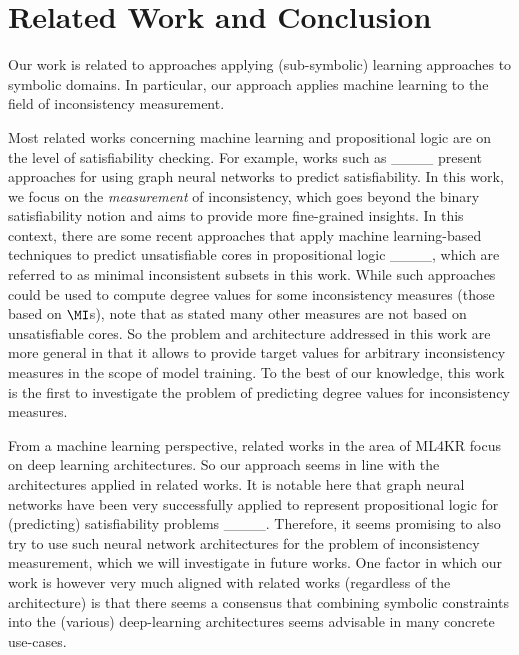 \section{Related Work and Conclusion}
\label{sec:conclusion}

Our work is related to approaches applying (sub-symbolic) learning approaches to symbolic domains. In particular, our approach applies machine learning to the field of inconsistency measurement.

Most related works concerning machine learning and propositional logic are on the level of satisfiability checking. For example, works such as ____ present approaches for using graph neural networks to predict satisfiability. In this work, we focus on the \emph{measurement} of inconsistency, which goes beyond the binary satisfiability notion and aims to provide more fine-grained insights. In this context, there are some recent approaches that apply machine learning-based techniques to predict unsatisfiable cores in propositional logic ____, which are referred to as minimal inconsistent subsets in this work. While such approaches could be used to compute degree values for some inconsistency measures (those based on $\MI$s), note that as stated many other measures are not based on unsatisfiable cores. So the problem and architecture addressed in this work are more general in that it allows to provide target values for arbitrary inconsistency measures in the scope of model training. To the best of our knowledge, this work is the first to investigate the problem of predicting degree values for inconsistency measures.

From a machine learning perspective, related works in the area of ML4KR focus on deep learning architectures. So our approach seems in line with the architectures applied in related works. It is notable here that graph neural networks have been very successfully applied to represent propositional logic for (predicting) satisfiability problems ____. Therefore, it seems promising to also try to use such neural network architectures for the problem of inconsistency measurement, which we will investigate in future works. One factor in which our work is however very much aligned with related works (regardless of the architecture) is that there seems a consensus that combining symbolic constraints into the (various) deep-learning architectures seems advisable in many concrete use-cases.


